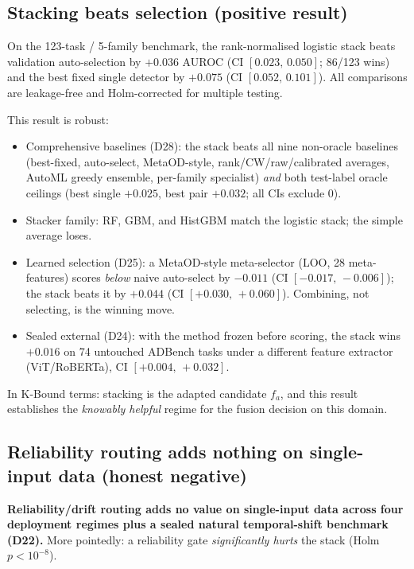 \subsection{Stacking beats selection (positive result)}\label{sec:elara-stacking}

On the 123-task / 5-family benchmark, the rank-normalised logistic stack beats
validation auto-selection by $+0.036$ AUROC (CI $[0.023,\, 0.050]$; 86/123 wins)
and the best fixed single detector by $+0.075$ (CI $[0.052,\, 0.101]$).  All
comparisons are leakage-free and Holm-corrected for multiple testing.

This result is robust:
\begin{itemize}
\item Comprehensive baselines (D28): the stack beats all nine non-oracle baselines
  (best-fixed, auto-select, MetaOD-style, rank/CW/raw/calibrated averages, AutoML
  greedy ensemble, per-family specialist) \emph{and} both test-label oracle
  ceilings (best single $+0.025$, best pair $+0.032$; all CIs exclude 0).
\item Stacker family: RF, GBM, and HistGBM match the logistic stack; the simple
  average loses.
\item Learned selection (D25): a MetaOD-style meta-selector (LOO, 28 meta-features)
  scores \emph{below} naive auto-select by $-0.011$ (CI $[-0.017,\, -0.006]$);
  the stack beats it by $+0.044$ (CI $[+0.030,\, +0.060]$).  Combining, not
  selecting, is the winning move.
\item Sealed external (D24): with the method frozen before scoring, the stack wins
  $+0.016$ on 74 untouched ADBench tasks under a different feature extractor
  (ViT/RoBERTa), CI $[+0.004,\, +0.032]$.
\end{itemize}

In K-Bound terms: stacking is the adapted candidate $f_a$, and this result establishes
the \emph{knowably helpful} regime for the fusion decision on this domain.

\subsection{Reliability routing adds nothing on single-input data (honest negative)}\label{sec:elara-routing-neg}

\textbf{Reliability/drift routing adds no value on single-input data across four
deployment regimes plus a sealed natural temporal-shift benchmark (D22).}  More
pointedly: a reliability gate \emph{significantly hurts} the stack (Holm $p < 10^{-8}$).

